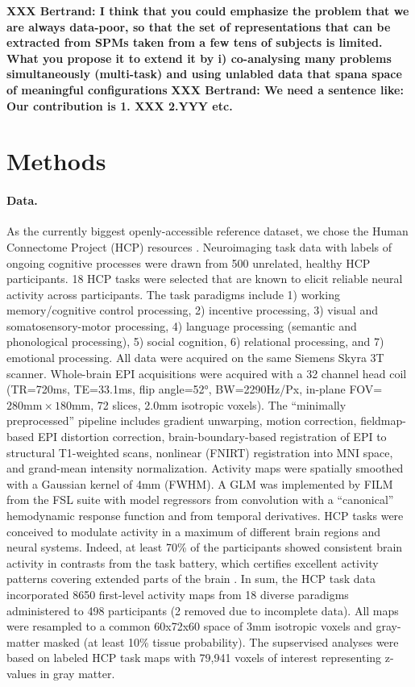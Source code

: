 \documentclass{article} %
\begin{document}
\textbf{XXX Bertrand: I think that you could emphasize the problem that we are always data-poor, so that the set of representations that  can be extracted from SPMs taken from  a few tens of subjects is limited. What you propose it to extend it by i) co-analysing many problems simultaneously (multi-task) and using unlabled data that spana space of meaningful configurations
}
\textbf{XXX Bertrand: We need a sentence like: Our contribution is 1. XXX 2.YYY etc.}


\section{Methods}
%
\paragraph{Data.}
As the currently biggest openly-accessible reference dataset,
we chose the Human Connectome Project (HCP) resources
\cite{barch2013}.
Neuroimaging task data with labels of ongoing cognitive processes
were drawn from 500 unrelated,
healthy HCP participants.
18 HCP tasks 
were selected that are known to elicit reliable neural activity
across participants.
The task paradigms include
1) working memory/cognitive control processing, 2)
incentive processing, 3) visual and somatosensory-motor processing,
4) language processing (semantic and phonological processing),
5) social cognition, 6) relational processing, and 7) emotional
processing. All data were acquired on the same Siemens Skyra 3T scanner.
Whole-brain EPI acquisitions were acquired with a
32 channel head coil (TR=720ms, TE=33.1ms, flip angle=52°, BW=2290Hz/Px,
in-plane FOV=$280\textrm{mm}\times180\textrm{mm}$, 72 slices, 2.0mm 
isotropic voxels).
The ``minimally preprocessed'' pipeline includes
gradient unwarping, motion correction, fieldmap-based EPI distortion
correction, brain-boundary-based registration of EPI to structural
T1-weighted scans, nonlinear (FNIRT) registration into MNI space,
and grand-mean intensity normalization. Activity maps were spatially
smoothed with a Gaussian kernel of 4mm (FWHM). A GLM was
implemented by FILM from the FSL suite with model regressors from convolution
with a “canonical” hemodynamic response function and from temporal derivatives.
HCP tasks were conceived to modulate activity
in a maximum of different brain regions and neural systems. Indeed, at
least 70\% of the participants showed consistent brain activity in
contrasts from the task battery, which certifies excellent
activity patterns covering extended parts of the brain \cite{barch2013}.
%
In sum, the HCP task data incorporated 8650 first-level activity maps
from 18 diverse paradigms administered to 498 participants (2 removed
due to incomplete data).
All maps were resampled to a common 60x72x60 space of
3mm isotropic voxels and gray-matter masked (at least 10\% tissue
probability).
The supservised analyses were based on labeled HCP task maps with
79,941 voxels of interest representing z-values in gray matter.
\end{document}
